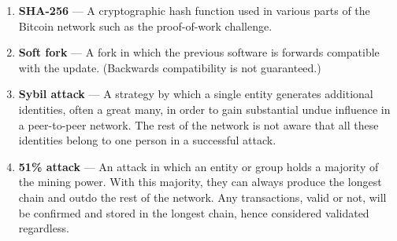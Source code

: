 \documentclass[11pt]{article}
\begin{document}
\begin{enumerate}
        \item \textbf{SHA-256} --- A cryptographic hash function used in various parts of the Bitcoin network such as the proof-of-work challenge.
        \item \textbf{Soft fork} --- A fork in which the previous software is forwards compatible with the update. (Backwards compatibility is not guaranteed.)
        \item \textbf{Sybil attack} --- A strategy by which a single entity generates additional identities, often a great many, in order to gain substantial undue influence in a peer-to-peer network. The rest of the network is not aware that all these identities belong to one person in a successful attack.
        \item \textbf{51\% attack} --- An attack in which an entity or group holds a majority of the mining power. With this majority, they can always produce the longest chain and outdo the rest of the network. Any transactions, valid or not, will be confirmed and stored in the longest chain, hence considered validated regardless.
    \end{enumerate}
\end{document}
